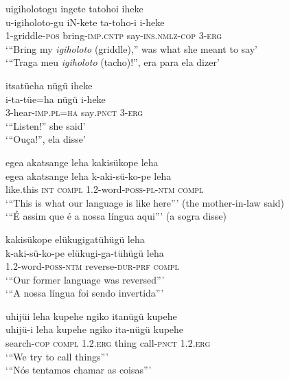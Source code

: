 \documentclass[output=paper,
modfonts,nonflat
]{langsci/langscibook}
\begin{document}
\ea uigiholotogu ingete tatohoi iheke \\[.3em]
\gll u-igiholoto-gu	iN-kete 		ta-toho-i 		i-heke \\
1-griddle-\textsc{pos} 	bring\textsc{-imp}.\textsc{cntp} 	say-\textsc{ins.nmlz-cop}	3-\textsc{erg} \\
\glt ‘“Bring my \emph{igiholoto} (griddle),” was what she meant to say’ \\
‘“Traga meu \emph{igiholoto} (tacho)!”, era para ela dizer’ \\
\z

 
\newpage  
\ea itsatüeha nügü iheke \\[.3em]
\gll i-ta-tüe=ha		nügü		i-heke \\
3-hear-\textsc{imp.pl=ha} 	say\textsc{.pnct} 	3-\textsc{erg} \\
\glt ‘“Listen!” she said’ \\
‘“Ouça!”, ela disse’ \\
\z

\ea egea akatsange leha kakisükope leha \\[.3em]
\gll egea		akatsange	leha	k-aki-sü-ko-pe		leha \\
like.this 	\textsc{int} 		\textsc{compl}	1.2-word-\textsc{poss-pl-ntm} 	\textsc{compl} \\
\glt ‘“This is what our language is like here”’ (the mother-in-law said) \\
‘“É assim que é a nossa língua aqui”’ (a sogra disse) \\
\z 

\ea kakisükope elükugigatühügü leha \\[.3em]
\gll k-aki-sü-ko-pe		elükugi-ga-tühügü	leha \\
1.2-word-\textsc{poss-ntm} 	reverse\textsc{-dur-prf} 	\textsc{compl} \\
\glt ‘“Our former language was reversed”’ \\
‘“A nossa língua foi sendo invertida”’ \\
\z 

\ea uhijüi leha kupehe ngiko itanügü kupehe \\[.3em]
\gll uhijü-i		leha	kupehe		ngiko	ita-nügü	kupehe \\
search-\textsc{cop} 	\textsc{compl} 1.2.\textsc{erg}	thing 	call-\textsc{pnct} 	1.2.\textsc{erg} \\
\glt ‘“We try to call things”’ \\
‘“Nós tentamos chamar as coisas”’ \\
\z
\end{document}
